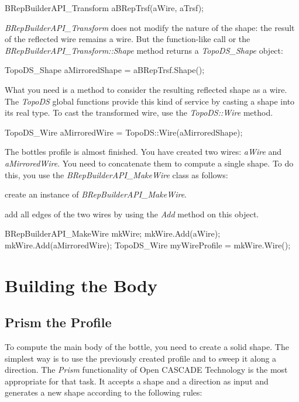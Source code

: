\begin{DoxyCode}
BRepBuilderAPI\_Transform aBRepTrsf(aWire, aTrsf);
\end{DoxyCode}


{\itshape B\+Rep\+Builder\+A\+P\+I\+\_\+\+Transform} does not modify the nature of the shape\+: the result of the reflected wire remains a wire. But the function-\/like call or the {\itshape B\+Rep\+Builder\+A\+P\+I\+\_\+\+Transform\+::\+Shape} method returns a {\itshape Topo\+D\+S\+\_\+\+Shape} object\+:


\begin{DoxyCode}
TopoDS\_Shape aMirroredShape = aBRepTrsf.Shape();
\end{DoxyCode}


What you need is a method to consider the resulting reflected shape as a wire. The {\itshape Topo\+DS} global functions provide this kind of service by casting a shape into its real type. To cast the transformed wire, use the {\itshape Topo\+D\+S\+::\+Wire} method.


\begin{DoxyCode}
TopoDS\_Wire aMirroredWire = TopoDS::Wire(aMirroredShape);
\end{DoxyCode}


The bottle\textquotesingle{}s profile is almost finished. You have created two wires\+: {\itshape a\+Wire} and {\itshape a\+Mirrored\+Wire}. You need to concatenate them to compute a single shape. To do this, you use the {\itshape B\+Rep\+Builder\+A\+P\+I\+\_\+\+Make\+Wire} class as follows\+:


\begin{DoxyItemize}
\item create an instance of {\itshape B\+Rep\+Builder\+A\+P\+I\+\_\+\+Make\+Wire}.
\item add all edges of the two wires by using the {\itshape Add} method on this object.
\end{DoxyItemize}


\begin{DoxyCode}
BRepBuilderAPI\_MakeWire mkWire;
mkWire.Add(aWire);
mkWire.Add(aMirroredWire);
TopoDS\_Wire myWireProfile = mkWire.Wire();
\end{DoxyCode}
\hypertarget{occt__tutorial_sec3}{}\section{Building the Body}\label{occt__tutorial_sec3}
\hypertarget{occt__tutorial_OCCT_TUTORIAL_SUB3_1}{}\subsection{Prism the Profile}\label{occt__tutorial_OCCT_TUTORIAL_SUB3_1}
To compute the main body of the bottle, you need to create a solid shape. The simplest way is to use the previously created profile and to sweep it along a direction. The {\itshape Prism} functionality of Open C\+A\+S\+C\+A\+DE Technology is the most appropriate for that task. It accepts a shape and a direction as input and generates a new shape according to the following rules\+:

